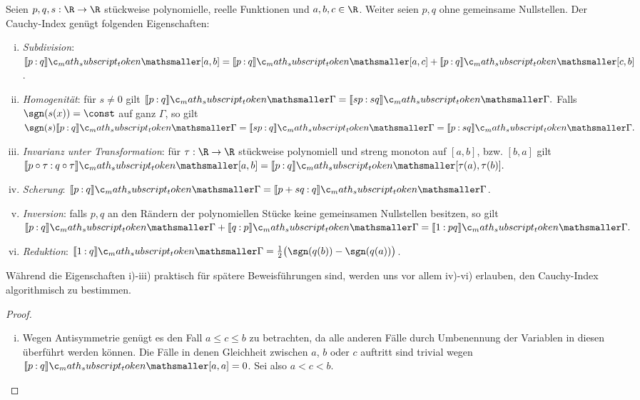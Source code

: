 \documentclass{mythesis}
\begin{document}
\begin{proposition} \label{thm:prop:ci_prop}
    Seien $p, q, s: \R \to \R$ stückweise polynomielle, reelle Funktionen und $a, b, c \in \R$.
    Weiter seien $p, q$ ohne gemeinsame Nullstellen.
    Der Cauchy-Index genügt folgenden Eigenschaften:
    \begin{enumerate}[i)]
        \item
            \emph{Subdivision}: $\Index{[a,b]}{p}{q} = \Index{[a,c]}{p}{q} + \Index{[c,b]}{p}{q}$.
        \item
            \emph{Homogenität}: für $s \neq 0$ gilt
            \begin{math}
                \Index{\Gamma}{p}{q} = \Index{\Gamma}{sp}{sq}.
            \end{math}
            Falls $\sgn(s(x)) = \const$ auf ganz $\Gamma$, so gilt
            \begin{math}
                \sgn(s) \Index{\Gamma}{p}{q} = \Index{\Gamma}{sp}{q} = \Index{\Gamma}{p}{sq}.
            \end{math}
        \item
            \emph{Invarianz unter Transformation}: für $\tau: \R \to \R$ stückweise polynomiell und streng monoton auf $[a, b]$, bzw. $[b, a]$ gilt
            \begin{math}[numbered] \label{eq:cauchy-index_transformation}
                \Index{[a,b]}{p\circ\tau }{ q\circ\tau} = \Index{[\tau(a),\tau(b)]}{p}{q}.
            \end{math}
        \item
            \emph{Scherung}: $\Index{\Gamma}{p}{q} = \Index{\Gamma}{p + sq }{ q}$.
        \item
            \emph{Inversion}: falls $p, q$ an den Rändern der polynomiellen Stücke keine gemeinsamen Nullstellen besitzen, so gilt
            \begin{math}
                \Index{\Gamma}{p}{q} + \Index{\Gamma}{q}{p} = \Index{\Gamma}{1}{pq}.
            \end{math}
        \item
            \emph{Reduktion}: $\Index{\Gamma}{1}{q} = \frac{1}{2}\big(\sgn(q(b)) - \sgn(q(a))\big)$.
    \end{enumerate}
    \begin{note}
        Während die Eigenschaften i)-iii) praktisch für spätere Beweisführungen sind, werden uns vor allem iv)-vi) erlauben, den Cauchy-Index algorithmisch zu bestimmen.
    \end{note}
    \begin{proof}
        \begin{enumerate}[i)]
            \item
                Wegen Antisymmetrie genügt es den Fall $a \le c \le b$ zu betrachten, da alle anderen Fälle durch Umbenennung der Variablen in diesen überführt werden können.
                Die Fälle in denen Gleichheit zwischen $a$, $b$ oder $c$ auftritt sind trivial wegen $\Index{[a,a]}{p}{q} = 0$.
                Sei also $a < c < b$.


\end{enumerate}
\end{proof}
\end{proposition}
\end{document}
